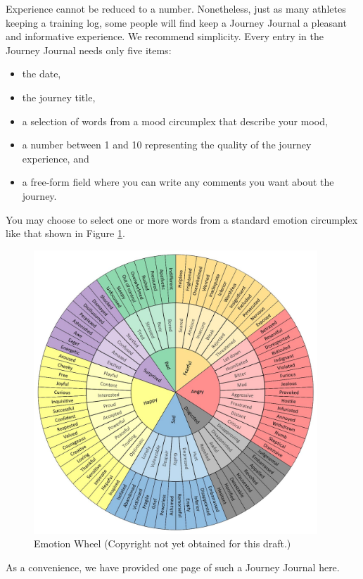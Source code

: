 \documentclass[12pt]{book}
\begin{document}
Experience cannot be reduced to a number.  Nonetheless, just
as many athletes keeping a training log, some people will find
keep a Journey Journal a pleasant and informative experience.
We recommend simplicity. Every entry in the Journey Journal
needs only five items:
\begin{itemize}
\item the date,
\item the journey title,
\item a selection of words from a mood circumplex that
  describe your mood,
\item a number between 1 and 10 representing the quality of
  the journey experience, and
\item a free-form field where you can write any comments
  you want about the journey.
\end{itemize}

You may choose to select one or more words from a standard
emotion circumplex like that shown in Figure \ref{fig:emotionwheel}.
\begin{figure}
  \centering
     \includegraphics[width=0.95\textwidth]{WacuriFigures/EmotionWheel.jpg}
     \caption{Emotion Wheel (Copyright not yet obtained for this draft.)}
  \label{fig:emotionwheel}     
\end{figure}


As a convenience, we have provided one page of such a Journey Journal here.
\end{document}
